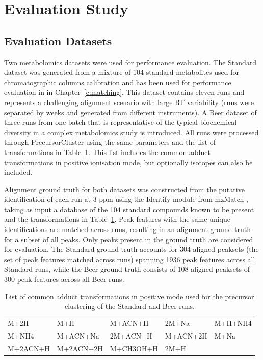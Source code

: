 \section{Evaluation Study}

\subsection{Evaluation Datasets}

Two metabolomics datasets were used for performance evaluation. The Standard dataset was generated from a mixture of 104 standard metabolites used for chromatographic columns calibration and has been used for performance evaluation in in Chapter~\ref{c:matching}. This dataset contains eleven runs and represents a challenging alignment scenario with large RT variability (runs were separated by weeks and generated from different instruments). A Beer dataset of three runs from one batch that is representative of the typical biochemical diversity in a complex metabolomics study is introduced. All runs were processed through PrecursorCluster using the same parameters and the list of transformations in Table~\ref{Tab:transformation}. This list includes the common adduct transformations in positive ionisation mode, but optionally isotopes can also be included.

Alignment ground truth for both datasets was constructed from the putative identification of each run at 3 ppm using the Identify module from mzMatch \cite{Scheltema2011}, taking as input a database of the 104 standard compounds known to be present and the transformations in Table~\ref{Tab:transformation}. Peak features with the same unique identifications are matched across runs, resulting in an alignment ground truth for a subset of all peaks. Only peaks present in the ground truth are considered for evaluation. The Standard ground truth accounts for 304 aligned peaksets (the set of peak features matched across runs) spanning 1936 peak features across all Standard runs, while the Beer ground truth consists of 108 aligned peaksets of 300 peak features across all Beer runs.

\begin{table}[!htbp]
\caption{List of common adduct transformations in positive mode used for the precursor clustering of the Standard and Beer runs.\label{Tab:transformation}}{\begin{tabular}{@{}lllll@{}}
M+2H & M+H & M+ACN+H & 2M+Na & M+H+NH4\\
M+NH4 & M+ACN+Na & 2M+ACN+H & M+ACN+2H & M+Na\\
M+2ACN+H & M+2ACN+2H & M+CH3OH+H & 2M+H
\end{tabular}}{}
\end{table}

